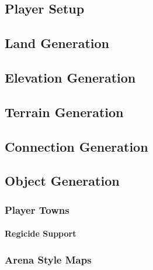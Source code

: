 \documentclass[]{article}
\theoremstyle{plain}
\theoremstyle{remark}
\theoremstyle{definition}
\begin{document}
\hypertarget{player-setup}{%
\subsection{Player Setup}\label{player-setup}}

\hypertarget{land-generation}{%
\subsection{Land Generation}\label{land-generation}}

\hypertarget{elevation-generation}{%
\subsection{Elevation Generation}\label{elevation-generation}}

\hypertarget{terrain-generation}{%
\subsection{Terrain Generation}\label{terrain-generation}}

\hypertarget{connection-generation}{%
\subsection{Connection Generation}\label{connection-generation}}

\hypertarget{object-generation}{%
\subsection{Object Generation}\label{object-generation}}

\hypertarget{player-towns}{%
\subsubsection{Player Towns}\label{player-towns}}

\hypertarget{regicide-support}{%
\paragraph{Regicide Support}\label{regicide-support}}

\hypertarget{arena-style-maps}{%
\subsubsection{Arena Style Maps}\label{arena-style-maps}}
\end{document}

